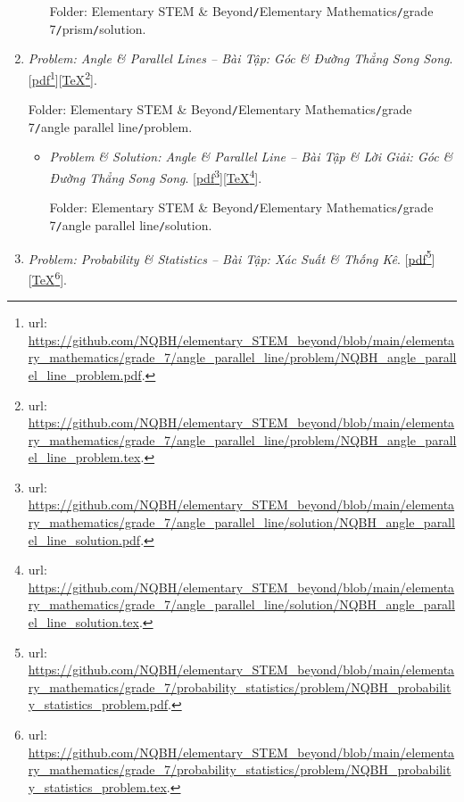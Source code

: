 \documentclass[12pt,oneside]{book}
\begin{document}
\begin{enumerate}
\begin{itemize}
		Folder: {\sf Elementary STEM \& Beyond{\tt/}Elementary Mathematics{\tt/}grade 7{\tt/}prism{\tt/}solution}.
	\end{itemize}
	\item {\it Problem: Angle \& Parallel Lines -- Bài Tập: Góc \& Đường Thẳng Song Song}. [\href{https://github.com/NQBH/elementary_STEM_beyond/blob/main/elementary_mathematics/grade_7/angle_parallel_line/problem/NQBH_angle_parallel_line_problem.pdf}{pdf}\footnote{{\sc url}: \url{https://github.com/NQBH/elementary_STEM_beyond/blob/main/elementary_mathematics/grade_7/angle_parallel_line/problem/NQBH_angle_parallel_line_problem.pdf}.}][\href{https://github.com/NQBH/elementary_STEM_beyond/blob/main/elementary_mathematics/grade_7/angle_parallel_line/problem/NQBH_angle_parallel_line_problem.tex}{\TeX}\footnote{{\sc url}: \url{https://github.com/NQBH/elementary_STEM_beyond/blob/main/elementary_mathematics/grade_7/angle_parallel_line/problem/NQBH_angle_parallel_line_problem.tex}.}].
	
	Folder: {\sf Elementary STEM \& Beyond{\tt/}Elementary Mathematics{\tt/}grade 7{\tt/}angle parallel line{\tt/}problem}.
	\begin{itemize}
		\item {\it Problem \& Solution: Angle \& Parallel Line -- Bài Tập \& Lời Giải: Góc \& Đường Thẳng Song Song}. [\href{https://github.com/NQBH/elementary_STEM_beyond/blob/main/elementary_mathematics/grade_7/angle_parallel_line/solution/NQBH_angle_parallel_line_solution.pdf}{pdf}\footnote{{\sc url}: \url{https://github.com/NQBH/elementary_STEM_beyond/blob/main/elementary_mathematics/grade_7/angle_parallel_line/solution/NQBH_angle_parallel_line_solution.pdf}.}][\href{https://github.com/NQBH/elementary_STEM_beyond/blob/main/elementary_mathematics/grade_7/angle_parallel_line/solution/NQBH_angle_parallel_line_solution.tex}{\TeX}\footnote{{\sc url}: \url{https://github.com/NQBH/elementary_STEM_beyond/blob/main/elementary_mathematics/grade_7/angle_parallel_line/solution/NQBH_angle_parallel_line_solution.tex}.}].
		
		Folder: {\sf Elementary STEM \& Beyond{\tt/}Elementary Mathematics{\tt/}grade 7{\tt/}angle parallel line{\tt/}solution}.
	\end{itemize}
	\item {\it Problem: Probability \& Statistics -- Bài Tập: Xác Suất \& Thống Kê}. [\href{https://github.com/NQBH/elementary_STEM_beyond/blob/main/elementary_mathematics/grade_7/probability_statistics/problem/NQBH_probability_statistics_problem.pdf}{pdf}\footnote{{\sc url}: \url{https://github.com/NQBH/elementary_STEM_beyond/blob/main/elementary_mathematics/grade_7/probability_statistics/problem/NQBH_probability_statistics_problem.pdf}.}][\href{https://github.com/NQBH/elementary_STEM_beyond/blob/main/elementary_mathematics/grade_7/probability_statistics/problem/NQBH_probability_statistics_problem.tex}{\TeX}\footnote{{\sc url}: \url{https://github.com/NQBH/elementary_STEM_beyond/blob/main/elementary_mathematics/grade_7/probability_statistics/problem/NQBH_probability_statistics_problem.tex}.}].
	

\end{enumerate}
\end{document}
